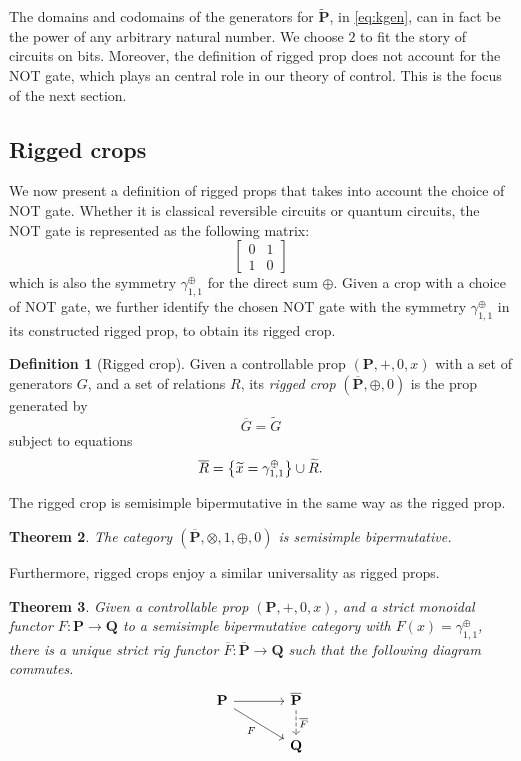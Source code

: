\documentclass[a4paper]{article}
\theoremstyle{plain}
\newtheorem{theorem}{Theorem}
\theoremstyle{definition}
\newtheorem{definition}[theorem]{Definition}
\newcommand{\cat}[1]{\mathbf{#1}}
\newcommand{\kcat}[1]{\mathbf{\widetilde{#1}}}
\newcommand{\scat}[1]{\mathbf{\ovl{#1}}}
\newcommand{\symplus}{\gamma^\oplus}
\newcommand{\ovl}[1]{\overline{#1}}
\begin{document}
The domains and codomains of the generators for $\kcat P$, in \eqref{eq:kgen},
can in fact be the power of any arbitrary natural number. We choose $2$ to fit
the story of circuits on bits. Moreover, the definition of rigged prop does not
account for the NOT gate, which plays an central role in our theory of control.
This is the focus of the next section.

\subsection{Rigged crops}

We now present a definition of rigged props that takes into account the choice
of NOT gate. Whether it is classical reversible circuits or quantum circuits,
the NOT gate is represented as the following matrix:
\[
	\begin{bmatrix}
		0 & 1 \\
		1 & 0
	\end{bmatrix}
\]
which is also the symmetry $\symplus_{1,1}$ for the direct sum $\oplus$. Given a
crop with a choice of NOT gate, we further identify the chosen NOT gate with
the symmetry $\symplus_{1,1}$ in its constructed rigged prop, to obtain its
rigged crop.

\begin{definition}[Rigged crop]
	Given a controllable prop $(\cat P, +, 0, x)$ with a set of generators $G$,
	and a set of relations $R$, its \emph{rigged crop} $(\scat P, \oplus, 0)$
	is the prop generated by
	\[
		\ovl G = \widetilde G
	\]
	subject to equations
	\[
		\ovl R =
		\left\{ \widetilde x = \symplus_{1,1} \right\}
		\cup
		\widetilde R\text.
	\]
\end{definition}

The rigged crop is semisimple bipermutative in the same way as the
rigged prop.

\begin{theorem}
	The category $(\scat P, \otimes, 1, \oplus, 0)$ is semisimple
	bipermutative.
\end{theorem}

Furthermore, rigged crops enjoy a similar universality as rigged props.

\begin{theorem}
	\label{th:suniv}
	Given a controllable prop $(\cat P, +, 0, x)$, and a strict monoidal
	functor $F \colon \cat P \to \cat Q$ to a semisimple bipermutative category
	with $F(x) = \symplus_{1,1}$, there is a unique strict rig functor $\ovl F
	\colon \scat P \to \cat Q$ such that the following diagram commutes.
	\[
		\begin{tikzcd}[column sep=large]
			\cat P & \scat P \\
			& \cat Q
			\arrow[from=1-1, to=1-2]
			\arrow["F"', from=1-1, to=2-2]
			\arrow[dashed, "\ovl F", from=1-2, to=2-2]
		\end{tikzcd}
	\]
\end{theorem}
\end{document}
